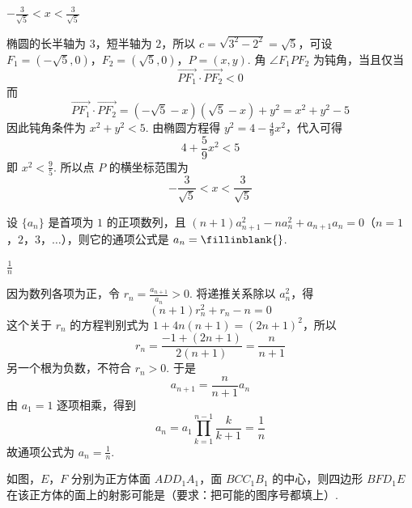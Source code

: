 \begin{answer}
\(-\frac{3}{\sqrt{5}}<x<\frac{3}{\sqrt{5}}\)
\end{answer}

\begin{solution}
椭圆的长半轴为 \(3\)，短半轴为 \(2\)，所以 \(c=\sqrt{3^2-2^2}=\sqrt5\)，可设
\(F_1=(-\sqrt5,0)\)，\(F_2=(\sqrt5,0)\)，\(P=(x,y)\). 角 \(\angle F_1PF_2\) 为钝角，当且仅当
\[
\overrightarrow{PF_1}\cdot\overrightarrow{PF_2}<0
\]
而
\[
\overrightarrow{PF_1}\cdot\overrightarrow{PF_2}
=(-\sqrt5-x)(\sqrt5-x)+y^2=x^2+y^2-5
\]
因此钝角条件为 \(x^2+y^2<5\). 由椭圆方程得 \(y^2=4-\frac49x^2\)，代入可得
\[
4+\frac59x^2<5
\]
即 \(x^2<\frac95\). 所以点 \(P\) 的横坐标范围为
\[
-\frac3{\sqrt5}<x<\frac3{\sqrt5}
\]
\end{solution}

\begin{problem}
设 \(\{a_n\}\) 是首项为 \(1\) 的正项数列，且 \((n+1)a_{n+1}^2-na_n^2+a_{n+1}a_n=0\)（\(n=1\)，\(2\)，\(3\)，\(\dots\)），则它的通项公式是 \(a_n=\fillinblank{}\).
\end{problem}

\begin{answer}
\(\frac{1}{n}\)
\end{answer}

\begin{solution}
因为数列各项为正，令 \(r_n=\frac{a_{n+1}}{a_n}>0\). 将递推关系除以 \(a_n^2\)，得
\[
(n+1)r_n^2+r_n-n=0
\]
这个关于 \(r_n\) 的方程判别式为 \(1+4n(n+1)=(2n+1)^2\)，所以
\[
r_n=\frac{-1+(2n+1)}{2(n+1)}=\frac{n}{n+1}
\]
另一个根为负数，不符合 \(r_n>0\). 于是
\[
a_{n+1}=\frac{n}{n+1}a_n
\]
由 \(a_1=1\) 逐项相乘，得到
\[
a_n=a_1\prod_{k=1}^{n-1}\frac{k}{k+1}
=\frac1n
\]
故通项公式为 \(a_n=\frac1n\).
\end{solution}

\begin{problem}
如图，\(E\)，\(F\) 分别为正方体面 \(ADD_1A_1\)，面 \(BCC_1B_1\) 的中心，则四边形 \(BFD_1E\) 在该正方体的面上的射影可能是\fillinblank{}（要求：把可能的图序号都填上）.

\begingroup
\leftskip=0pt\relax
\everypar{}
\endgroup
\end{problem}

